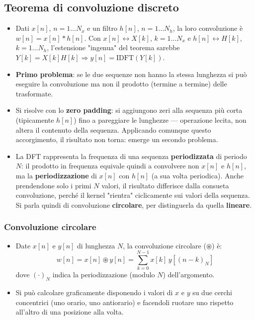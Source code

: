 \documentclass[12pt, a4paper]{article}
\begin{document}
\subsection{Teorema di convoluzione discreto}
\begin{itemize}
    \item Dati $x[n]$, $n=1\dots N_x$ e un filtro $h[n]$, $n=1\dots N_h$, la loro convoluzione è $w[n]=x[n]*h[n]$. Con $x[n]\leftrightarrow X[k]$, $k=1\dots N_x$ e $h[n]\leftrightarrow H[k]$, $k=1\dots N_h$, l'estensione "ingenua" del teorema sarebbe $Y[k]=X[k]H[k] \Rightarrow y[n]=\text{IDFT}(Y[k])$.
    \item \textbf{Primo problema}: se le due sequenze non hanno la stessa lunghezza si può eseguire la convoluzione ma non il prodotto (termine a termine) delle trasformate.
    \item Si risolve con lo \textbf{zero padding}: si aggiungono zeri alla sequenza più corta (tipicamente $h[n]$) fino a pareggiare le lunghezze — operazione lecita, non altera il contenuto della sequenza. Applicando comunque questo accorgimento, il risultato non torna: emerge un secondo problema.
    \item La DFT rappresenta la frequenza di una sequenza \textbf{periodizzata} di periodo $N$: il prodotto in frequenza equivale quindi a convolvere non $x[n]$ e $h[n]$, ma la \textbf{periodizzazione} di $x[n]$ con $h[n]$ (a sua volta periodica). Anche prendendone solo i primi $N$ valori, il risultato differisce dalla consueta convoluzione, perché il kernel "rientra" ciclicamente sui valori della sequenza. Si parla quindi di convoluzione \textbf{circolare}, per distinguerla da quella \textbf{lineare}.
\end{itemize}

\subsubsection{Convoluzione circolare}
\begin{itemize}
    \item Date $x[n]$ e $y[n]$ di lunghezza $N$, la convoluzione circolare ($\circledast$) è:
    $$w[n] = x[n]\circledast y[n] = \sum_{k=0}^{N-1} x[k]\,y[(n-k)_N]$$
    dove $(\cdot)_N$ indica la periodizzazione (modulo $N$) dell'argomento.
    \item Si può calcolare graficamente disponendo i valori di $x$ e $y$ su due cerchi concentrici (uno orario, uno antiorario) e facendoli ruotare uno rispetto all'altro di una posizione alla volta.
\end{itemize}
\end{document}
